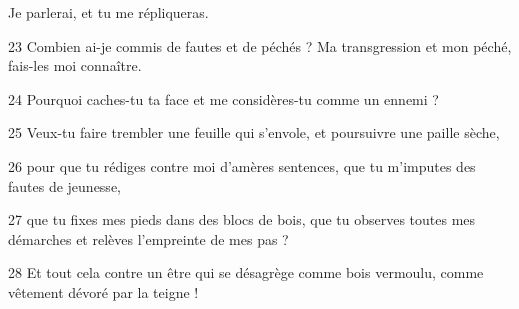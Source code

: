 Je parlerai, et tu me répliqueras.

23 Combien ai-je commis de fautes et de péchés ? Ma transgression et mon péché, fais-les moi connaître.

24 Pourquoi caches-tu ta face et me considères-tu comme un ennemi ?

25 Veux-tu faire trembler une feuille qui s’envole, et poursuivre une paille sèche,

26 pour que tu rédiges contre moi d’amères sentences, que tu m’imputes des fautes de jeunesse,

27 que tu fixes mes pieds dans des blocs de bois, que tu observes toutes mes démarches et relèves l’empreinte de mes pas ?

28 Et tout cela contre un être qui se désagrège comme bois vermoulu, comme vêtement dévoré par la teigne !